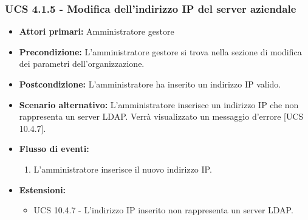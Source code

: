 \subsubsection{UCS 4.1.5 - Modifica dell'indirizzo IP del server aziendale}%
\begin{itemize}
\item \textbf{Attori primari:} Amministratore gestore
\item \textbf{Precondizione:} L'amministratore gestore si trova nella sezione di modifica dei parametri dell'organizzazione.
\item \textbf{Postcondizione:} L'amministratore ha inserito un indirizzo IP valido.
\item \textbf{Scenario alternativo:} L'amministratore inserisce un indirizzo IP che non rappresenta un server LDAP. Verrà visualizzato un messaggio d'errore [UCS 10.4.7].
\item \textbf{Flusso di eventi:}
\begin{enumerate}
    \item L'amministratore inserisce il nuovo indirizzo IP.
\end{enumerate}
\item \textbf{Estensioni:}
\begin{itemize}
    \item UCS 10.4.7 - L'indirizzo IP inserito non rappresenta un server LDAP.
\end{itemize}
\end{itemize}



